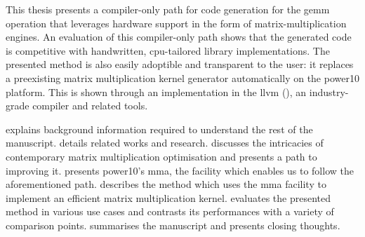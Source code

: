 \documentclass[\main/thesis.tex]{subfiles}
\begin{document}
This thesis presents a compiler-only path for code generation for the \gls{gemm} operation that leverages hardware support in the form of matrix-multiplication engines.
An evaluation of this compiler-only path shows that the generated code is competitive with handwritten, cpu-tailored library implementations.
The presented method is also easily adoptible and transparent to the user: it replaces a preexisting matrix multiplication kernel generator automatically on the \gls{power10} platform.
This is shown through an implementation in the \gls{llvm} (), an industry-grade compiler and related tools.

 explains background information required to understand the rest of the manuscript.
 details related works and research.
 discusses the intricacies of contemporary matrix multiplication optimisation and presents a path to improving it.
 presents \gls{power10}'s \gls{mma}, the facility which enables us to follow the aforementioned path.
 describes the method which uses the \gls{mma} facility to implement an efficient matrix multiplication kernel.
 evaluates the presented method in various use cases and contrasts its performances with a variety of comparison points.
 summarises the manuscript and presents closing thoughts.

\end{document}
